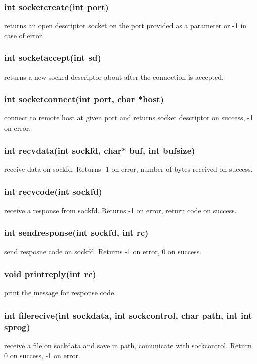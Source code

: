 \documentclass[runningheads]{llncs}
\begin{document}
        \subsubsection{int socket\textunderscore create(int port)}
            returns an open descriptor socket on the port provided as a parameter or -1 in case of error.
        \subsubsection{int socket\textunderscore accept(int sd)}
            returns a new socked descriptor about after the connection is accepted.
        \subsubsection{int socket\textunderscore connect(int port, char *host)}
            connect to remote host at given port and returns socket descriptor on success, -1 on error.
        \subsubsection{int recv\textunderscore data(int sockfd, char* buf, int bufsize)}
            receive data on sockfd. Returns -1 on error, number of bytes received on success.
        \subsubsection{int recv\textunderscore code(int sockfd)}
            receive a response from sockfd. Returns -1 on error, return code on success.
        \subsubsection{int send\textunderscore response(int sockfd, int rc)}
            send resposne code on sockfd. Returns -1 on error, 0 on success.
        \subsubsection{void print\textunderscore reply(int rc)}
            print the message for response code.
        \subsubsection{int file\textunderscore recive(int sock\textunderscore data, int sock\textunderscore control, char  path, int int s\textunderscore prog)}
            receive a file on sock\textunderscore data and save in path, comunicate with sock\textunderscore control. Return 0 on success, -1 on error.
\end{document}
